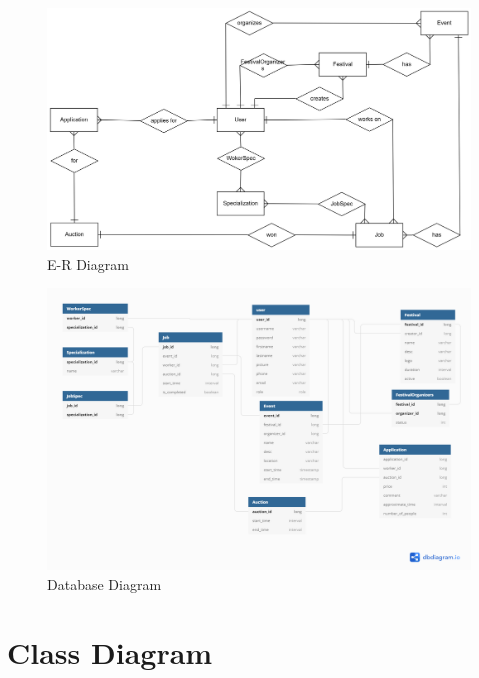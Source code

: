 				
				\begin{figure}[H]
					\includegraphics[width=\linewidth]{diagrams/db_er_diag.png}
					\centering
					\caption{E-R Diagram}
					\label{fig:er_diag}
				\end{figure}
			
				\begin{figure}[H]
					\includegraphics[width=\linewidth]{diagrams/db_normal_diag.png}
					\centering
					\caption{Database Diagram}
					\label{fig:normal_diag}
				\end{figure}
			
			\eject
			
			\pagebreak
		\section{Class Diagram}
			
